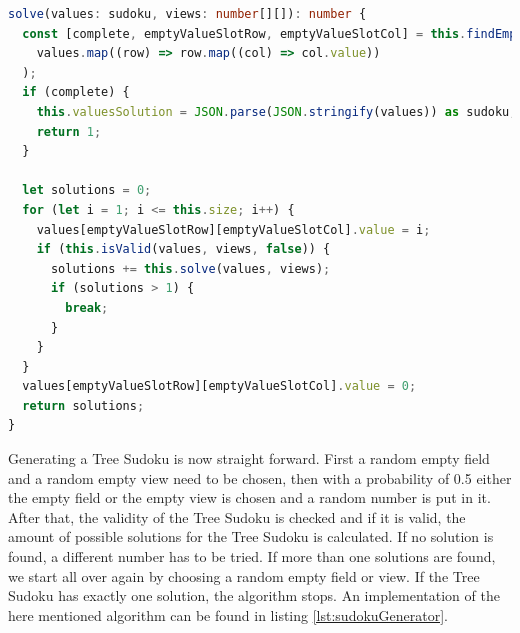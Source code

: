 \begin{lstlisting}[language=TypeScript,caption={Solving algorithm for a Tree Sudoku instance},label={lst:sudokuSolver}]
solve(values: sudoku, views: number[][]): number {
  const [complete, emptyValueSlotRow, emptyValueSlotCol] = this.findEmptySlot(
    values.map((row) => row.map((col) => col.value))
  );
  if (complete) {
    this.valuesSolution = JSON.parse(JSON.stringify(values)) as sudoku; // deep copy
    return 1;
  }

  let solutions = 0;
  for (let i = 1; i <= this.size; i++) {
    values[emptyValueSlotRow][emptyValueSlotCol].value = i;
    if (this.isValid(values, views, false)) {
      solutions += this.solve(values, views);
      if (solutions > 1) {
        break;
      }
    }
  }
  values[emptyValueSlotRow][emptyValueSlotCol].value = 0;
  return solutions;
}
\end{lstlisting}

Generating a Tree Sudoku is now straight forward. First a random empty field and a random empty view need to be chosen, then with a probability of 0.5 either the empty field or the empty view is chosen and a random number is put in it. After that, the validity of the Tree Sudoku is checked and if it is valid, the amount of possible solutions for the Tree Sudoku is calculated. If no solution is found, a different number has to be tried. If more than one solutions are found, we start all over again by choosing a random empty field or view. If the Tree Sudoku has exactly one solution, the algorithm stops. An implementation of the here mentioned algorithm can be found in listing \ref{lst:sudokuGenerator}.

